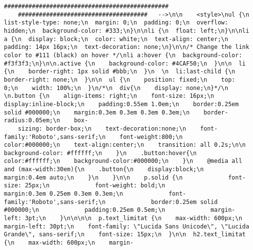 \begin{lstlisting}[style=myArduino]
    ###############################################
    #####################################   -->\n\n    <style>\nul {\n  list-style-type: none;\n  margin: 0;\n  padding: 0;\n  overflow: hidden;\n  background-color: #333;\n}\n\nli {\n  float: left;\n}\n\nli a {\n  display: block;\n  color: white;\n  text-align: center;\n  padding: 14px 16px;\n  text-decoration: none;\n}\n\n/* Change the link color to #111 (black) on hover */\nli a:hover {\n  background-color: #f3f3f3;\n}\n\n.active {\n    background-color: #4CAF50;\n  }\n\n  li {\n    border-right: 1px solid #bbb;\n  }\n  \n  li:last-child {\n    border-right: none;\n  }\n\n  ul {\n    position: fixed;\n    top: 0;\n    width: 100%;\n  }\n/*\n  div{\n    display: none;\n}*/\n    \n.button {\n    align-items: right;\n    font-size: 16px;\n    display:inline-block;\n    padding:0.55em 1.0em;\n    border:0.25em solid #000000;\n    margin:0.3em 0.3em 0.3em 0.3em;\n    border-radius:0.05em;\n    box-
    sizing: border-box;\n    text-decoration:none;\n    font-family:'Roboto',sans-serif;\n    font-weight:800;\n    color:#000000;\n    text-align:center;\n    transition: all 0.2s;\n\n    background-color: #ffffff;\n    }\n    .button:hover{\n    color:#ffffff;\n    background-color:#000000;\n    }\n    @media all and (max-width:30em){\n    .button{\n    display:block;\n    margin:0.4em auto;\n    }\n    }\n\n    p.solid {\n             font-size: 25px;\n             font-weight: bold;\n             margin:0.3em 0.25em 0.3em 0.3em;\n             font-family:'Roboto',sans-serif;\n             border:0.25em solid #000000;\n             padding:0.25em 0.5em;\n             margin-left: 3pt;\n    }\n\n\n\n  p.text_limitat {\n    max-width: 600px;\n    margin-left: 30pt;\n    font-family: \"Lucida Sans Unicode\", \"Lucida Grande\", sans-serif;\n    font-size: 15px;\n  }\n\n  h2.text_limitat {\n    max-width: 600px;\n    margin-

\end{lstlisting}

